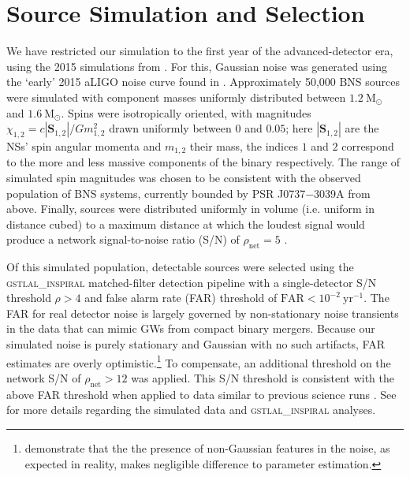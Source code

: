 \section{Source Simulation and Selection}\label{sec:sources}

We have restricted our simulation to the first year of the advanced-detector era, using the 2015 simulations from \citet{Singer_2014}. For this, Gaussian noise was generated using the `early' 2015 aLIGO noise curve found in \citet{Barsotti:2012}. Approximately 50,000 BNS sources were simulated with component masses uniformly distributed between $1.2~\mathrm{M}_\odot$ and $1.6~\mathrm{M}_\odot$. Spins were isotropically oriented, with magnitudes $\chi_{1,2} = c |\mathbf{S}_{1,2}|/G m_{1,2}^2$ drawn uniformly between $0$ and $0.05$; here $|\mathbf{S}_{1,2}|$ are the NSs' spin angular momenta and $m_{1,2}$ their mass, the indices $1$ and $2$ correspond to the more and less massive components of the binary respectively.  The range of simulated spin magnitudes was chosen to be consistent with the observed population of BNS systems, currently bounded by PSR J0737$-$3039A \citep{Burgay_2003,Brown_2012} from above.  Finally, sources were distributed uniformly in volume (i.e. uniform in distance cubed) to a maximum distance at which the loudest signal would produce a network signal-to-noise ratio (S/N) of $\rho_\mathrm{net} = 5$ \citep{Singer_2014}.

Of this simulated population, detectable sources were selected using the \textsc{gstlal\_inspiral} matched-filter detection pipeline \citep{Cannon_2012} with a single-detector S/N threshold $\rho>4$ and false alarm rate (FAR) threshold of $\mathrm{FAR}<10^{-2}~\mathrm{yr}^{-1}$.  The FAR for real detector noise is largely governed by non-stationary noise transients in the data that can mimic GWs from compact binary mergers.  Because our simulated noise is purely stationary and Gaussian with no such artifacts, FAR estimates are overly optimistic.\footnote{\citet{Berry_2015} demonstrate that the the presence of non-Gaussian features in the noise, as expected in reality, makes negligible difference to parameter estimation.} To compensate, an additional threshold on the network S/N of $\rho_\mathrm{net} > 12$ was applied. This S/N threshold is consistent with the above FAR threshold when applied to data similar to previous science runs \cite{2013arXiv1304.0670L,Berry_2014}. See \citet{Singer_2014} for more details regarding the simulated data and \textsc{gstlal\_inspiral} analyses.